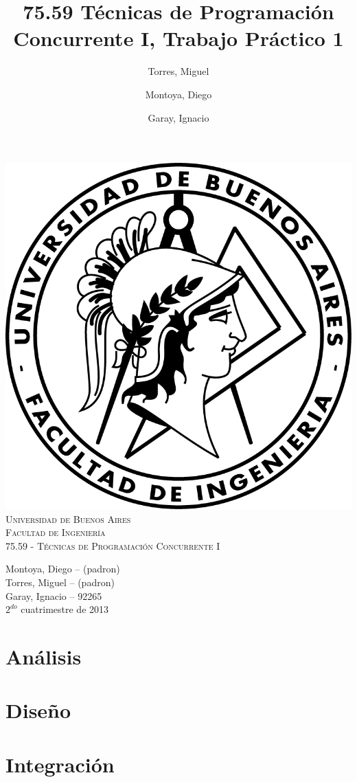 \documentclass[a4paper,12pt,titlepage]{article}
\title{75.59 Técnicas de Programación Concurrente I, Trabajo Práctico 1}
\author{Torres, Miguel \and Montoya, Diego \and Garay, Ignacio}
\begin{document}
\thispagestyle{empty}
\begin{center}
\includegraphics{./logo-fiuba.png}\\
\vspace{1cm}
\textsc{\LARGE Universidad de Buenos Aires}\\[0.3cm]
\textsc{\LARGE Facultad de Ingenier\'ia}\\[1.2cm]
\textsc{\Large 75.59 - Técnicas de Programación Concurrente I}\\[0.3cm]
\end{center}

\begin{flushright}
{\large
Montoya, Diego -- (padron)\\
Torres, Miguel -- (padron)\\
Garay, Ignacio -- 92265\\
\vspace{2cm}
$2^{do}$ cuatrimestre de 2013}
\end{flushright}

\pagestyle{fancy}
\setcounter{page}{1}
\newpage

\tableofcontents
\newpage

\footnotesize
\section{Análisis}
\newpage
\section{Diseño}
\newpage
\section{Integración}
\end{document}
